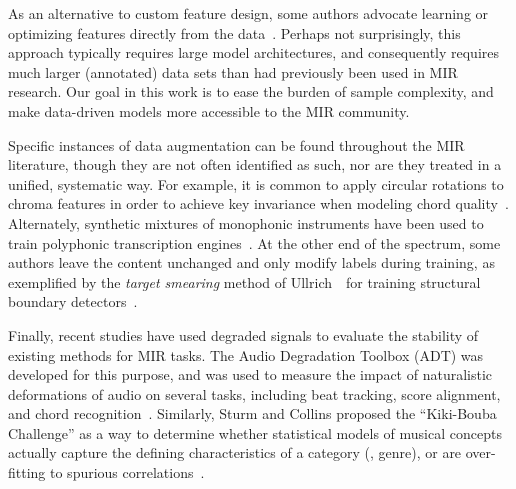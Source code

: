 \documentclass{article}
\begin{document}
%
%   
%
As an alternative to custom feature design, some authors advocate learning or optimizing
features directly from the data~\cite{humphrey2012moving}.  
Perhaps not surprisingly, this approach typically requires large model architectures, and 
consequently requires much larger (annotated) data sets than had previously been 
used in MIR research.  
Our goal in this work is to ease the burden of sample complexity, and make 
data-driven models more accessible to the MIR community.

%
Specific instances of data augmentation can be found throughout the MIR literature,
though they are not often identified as such, nor are they treated in a unified,
systematic way.  For example, it is common to apply circular rotations to chroma features 
in order to achieve key invariance when modeling chord quality~\cite{lee2008acoustic}.
Alternately, synthetic mixtures of monophonic instruments have been used 
to train polyphonic transcription engines~\cite{kirchhoff2012multi}.
At the other end of the spectrum, some authors leave the content unchanged and 
only modify labels during training, as exemplified by the \emph{target smearing} 
method of Ullrich~\etal\ for training structural boundary 
detectors~\cite{ullrich2014boundary}.

%   
%   
Finally, recent studies have used degraded signals to evaluate the stability of
existing methods for MIR tasks.
The Audio Degradation Toolbox (ADT) was developed for this purpose, and was used
to measure the impact of naturalistic deformations of audio on several tasks, including
beat tracking, score alignment, and chord recognition~\cite{mauch2013audio}.
Similarly, Sturm and Collins proposed the ``Kiki-Bouba Challenge'' as a way to determine
whether statistical models of musical concepts actually capture the defining
characteristics of a category (\eg, genre), or are over-fitting to spurious
correlations~\cite{sturmkiki}.
\end{document}
